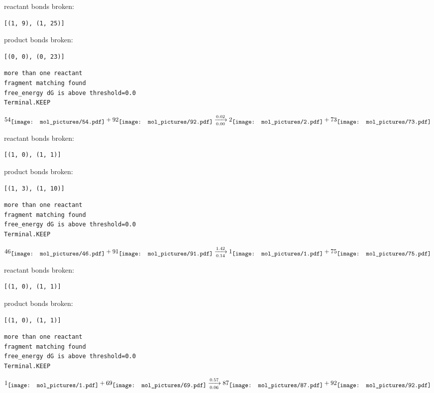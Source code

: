 \documentclass{article}
\begin{document}
reactant bonds broken:\begin{verbatim}
[(1, 9), (1, 25)]
\end{verbatim}
product bonds broken:\begin{verbatim}
[(0, 0), (0, 23)]
\end{verbatim}




\vspace{1cm}
\begin{verbatim}
more than one reactant
fragment matching found
free_energy dG is above threshold=0.0
Terminal.KEEP
\end{verbatim}
$$
54
\raisebox{-.5\height}{\texttt{[image: mol\_pictures/54.pdf]}}
+
92
\raisebox{-.5\height}{\texttt{[image: mol\_pictures/92.pdf]}}
\xrightarrow[0.00]{0.02}
2
\raisebox{-.5\height}{\texttt{[image: mol\_pictures/2.pdf]}}
+
73
\raisebox{-.5\height}{\texttt{[image: mol\_pictures/73.pdf]}}
$$


reactant bonds broken:\begin{verbatim}
[(1, 0), (1, 1)]
\end{verbatim}
product bonds broken:\begin{verbatim}
[(1, 3), (1, 10)]
\end{verbatim}




\vspace{1cm}
\begin{verbatim}
more than one reactant
fragment matching found
free_energy dG is above threshold=0.0
Terminal.KEEP
\end{verbatim}
$$
46
\raisebox{-.5\height}{\texttt{[image: mol\_pictures/46.pdf]}}
+
91
\raisebox{-.5\height}{\texttt{[image: mol\_pictures/91.pdf]}}
\xrightarrow[0.14]{1.42}
1
\raisebox{-.5\height}{\texttt{[image: mol\_pictures/1.pdf]}}
+
75
\raisebox{-.5\height}{\texttt{[image: mol\_pictures/75.pdf]}}
$$


reactant bonds broken:\begin{verbatim}
[(1, 0), (1, 1)]
\end{verbatim}
product bonds broken:\begin{verbatim}
[(1, 0), (1, 1)]
\end{verbatim}




\vspace{1cm}
\begin{verbatim}
more than one reactant
fragment matching found
free_energy dG is above threshold=0.0
Terminal.KEEP
\end{verbatim}
$$
1
\raisebox{-.5\height}{\texttt{[image: mol\_pictures/1.pdf]}}
+
69
\raisebox{-.5\height}{\texttt{[image: mol\_pictures/69.pdf]}}
\xrightarrow[0.06]{0.57}
87
\raisebox{-.5\height}{\texttt{[image: mol\_pictures/87.pdf]}}
+
92
\raisebox{-.5\height}{\texttt{[image: mol\_pictures/92.pdf]}}
$$
\end{document}
